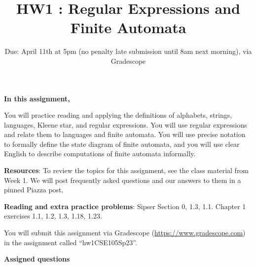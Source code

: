 

\title{HW1 : Regular Expressions and Finite Automata}
\date{Due: April 11th at 5pm (no penalty late submission until 8am next morning), via Gradescope}

\newcommand{\SUBSTRING}{\textsc{Substring}}
\newcommand{\REP}{\textsc{Rep}}



\maketitle
\thispagestyle{fancy}


{\bf In this assignment,}

You will practice reading and
applying the definitions of alphabets, strings, languages, Kleene star, and regular expressions.
You will use regular expressions and relate them to languages and finite automata.
You will use precise notation to formally define the state diagram of finite automata,
and you will use clear English to describe computations of finite automata informally.


{\bf Resources}: To review the topics 
for this assignment, see the class material from Week 1.
We will post frequently asked questions and our answers to them in a 
pinned Piazza post.

{\bf Reading and extra practice problems}: Sipser Section 0, 1.3, 1.1.
Chapter 1 exercises 1.1, 1.2, 1.3, 1.18, 1.23.

\instructions

You will submit this assignment via Gradescope
(\href{https://www.gradescope.com}{https://www.gradescope.com}) 
in the assignment called ``hw1CSE105Sp23''.

{\bf Assigned questions}

